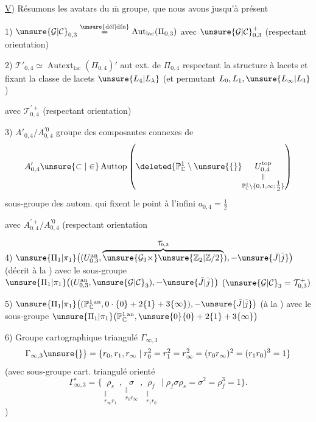 \uline{V}) Résumons les avatars du $\overline{\mathrm m}$ groupe, que nous avons
 jusqu'à présent

1) $\unsure{\mathcal{G}|\mathcal{C}}_{0,3}\overset{\unsure{\text{déf}|\text{dfn}}}{=}\operatorname{Aut}_{\mathrm{lac}}(\Pi_{0,3})$
avec  $\unsure{\mathcal{G}|\mathcal{C}}_{0,3}^{+}$ (respectant orientation)

2) $\mathcal{T}'_{0,4}\simeq\operatorname{Autext}_{\mathrm{lac}}(\Pi_{0,4})'$
aut ext. de $\Pi_{0,4}$ respectant la structure à lacets et fixant la classe de lacets
$\unsure{L_4|L_\lambda}$ (et permutant $L_0,L_1,\unsure{L_\infty|L_3}$)

avec $\mathcal{T}_{0,4}^{\prime+}$ (respectant orientation)

3) $A'_{0,4}/A_{0,4}^{\prime0}$ groupe des composantes connexes de
\[
A'_{0,4}\unsure{\subset|\in}\operatorname{Auttop}
\left(\deleted{\mathbb P^1_{\mathbb C}\setminus\unsure{\{}}
\underset{\substack{\Vert\\\mathbb P^1_{\mathbb C}\setminus\{0,1,\infty;\tfrac12\}}}{U_{0,4}^{\mathrm{top}}}\right)
\]
sous-groupe des autom. qui fixent le point à l'infini $a_{0,4}=\tfrac12$

avec $A_{0,4}^{\prime+}/A_{0,4}^{\prime0}$ (respectant orientation

4) $\unsure{\Pi_1|\pi_1}\bigl((U_{0,3}^{\mathrm{an}},\overbrace{\unsure{\mathcal{G}_3\times}\unsure{\mathbb Z_2|\mathbb Z/2}}^{\mathcal{T}_{0,3}}),-\unsure{\bar J|\bar j}\bigr)$
(décrit à la )
avec le sous-groupe $\unsure{\Pi_1|\pi_1}\bigl((U_{0,3}^{\mathrm{an}},\unsure{\mathcal{G}|\mathcal{C}}_3),-\unsure{\bar J|\bar j}\bigr)$
$(\unsure{\mathcal{G}|\mathcal{C}}_3=\mathcal{T}_{0,3}^{+})$

5) $\unsure{\Pi_1|\pi_1}\bigl((\mathbb P^{1\,\mathrm{an}}_{\mathbb C},0\cdot\{0\}+2\{1\}+3\{\infty\}),-\unsure{\bar J|\bar j}\bigr)$
(à la )
avec le sous-groupe $\unsure{\Pi_1|\pi_1}\bigl(\mathbb P^{1\,\mathrm{an}}_{\mathbb C},\unsure{0}\{0\}+2\{1\}+3\{\infty\}\bigr)$

6) Groupe cartographique triangulé  $\Gamma_{\infty,3}$
\[
\Gamma_{\infty,3}\unsure{\}}=\{r_0,r_1,r_\infty\mid
r_0^2=r_1^2=r_\infty^2=(r_0r_\infty)^2=(r_1r_0)^3=1\}
\]
(avec sous-groupe cart. triangulé orienté
\[
\Gamma_{\infty,3}^{\circ}=\{
\underset{\substack{\Vert\\r_\infty r_1}}{\rho_s},
\underset{\substack{\Vert\\r_0r_\infty}}{\sigma},
\underset{\substack{\Vert\\r_1r_0}}{\rho_f}
\mid\rho_f\sigma\rho_s=\sigma^2=\rho_f^3=1\}.
\]
)


